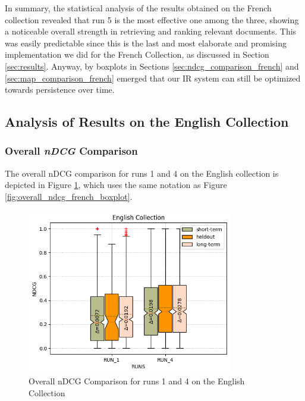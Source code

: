 In summary, the statistical analysis of the results obtained on the French collection revealed that run 5 is the most effective one among the three, showing a noticeable overall strength in retrieving and ranking relevant documents. 
This was easily predictable since this is the last and most elaborate and promising implementation we did for the French Collection, as discussed in Section \ref{sec:results}.   
Anyway, by boxplots in Sections \ref{sec:ndcg_comparison_french} and \ref{sec:map_comparison_french} emerged that our \ac{IR} system can still be optimized towards persistence over time. 


\newpage
\enlargethispage{8\baselineskip}
\subsection{Analysis of Results on the English Collection}

\subsubsection{Overall \textit{nDCG} Comparison} \label{sec:ndcg_comparison_eng}

The overall \ac{nDCG} comparison for runs 1 and 4 on the English collection is depicted in Figure \ref{fig:overall_ndcg_eng}, which uses the same notation as Figure \ref{fig:overall_ndcg_french_boxplot}.

\begin{figure}[!h]
\centering
\includegraphics[width=0.8\textwidth]{figure/StatisticalAnalysis/BoxPlot/NDGC ENGLISH.png}
\caption{Overall nDCG Comparison for runs 1 and 4 on the English Collection}
\label{fig:overall_ndcg_eng}
\end{figure}
 
